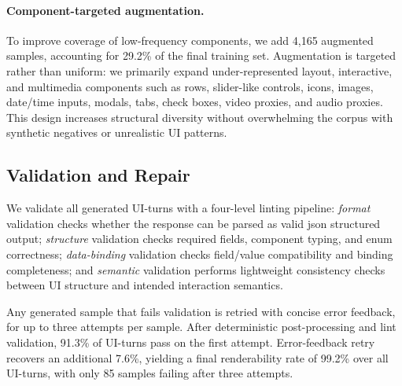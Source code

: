 \paragraph{Component-targeted augmentation.}
To improve coverage of low-frequency components, we add 4{,}165 augmented samples, accounting for 29.2\% of the final training set. Augmentation is targeted rather than uniform: we primarily expand under-represented layout, interactive, and multimedia components such as rows, slider-like controls, icons, images, date/time inputs, modals, tabs, check boxes, video proxies, and audio proxies. This design increases structural diversity without overwhelming the corpus with synthetic negatives or unrealistic UI patterns.



\subsection{Validation and Repair}
\label{subsec:data-validation}

We validate all generated UI-turns with a four-level linting pipeline:
\emph{format} validation checks whether the response can be parsed as valid json structured output;
\emph{structure} validation checks required fields, component typing, and enum correctness;
\emph{data-binding} validation checks field/value compatibility and binding completeness;
and \emph{semantic} validation performs lightweight consistency checks between UI structure and intended interaction semantics.

Any generated sample that fails validation is retried with concise error feedback, for up to
three attempts per sample. After deterministic post-processing and lint validation, 91.3\%
of UI-turns pass on the first attempt. Error-feedback retry recovers an additional 7.6\%,
yielding a final renderability rate of 99.2\% over all UI-turns, with only 85 samples failing
after three attempts.



